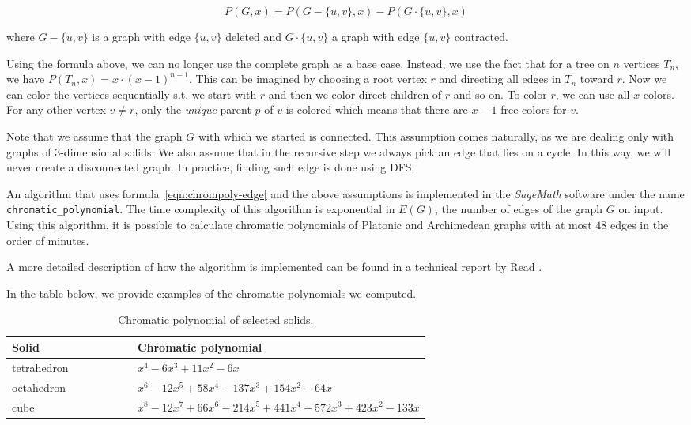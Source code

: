 \begin{equation}\label{eqn:chrompoly-edge}
    P(G,x) = P(G - \{u,v\},x) - P(G \cdot \{u,v\},x)
\end{equation}

where $G - \{u,v\}$ is a graph with edge $\{u,v\}$ deleted and $G \cdot \{u,v\}$ a graph with edge $\{u,v\}$ contracted. 

Using the formula above, we can no longer use the complete graph as a base case. Instead, we use the fact that for a tree on $n$ vertices $T_n$, we have $P(T_n,x) = x \cdot (x-1)^{n-1}$. This can be imagined by choosing a root vertex $r$ and directing all edges in $T_n$ toward $r$. Now we can color the vertices sequentially s.t. we start with $r$ and then we color direct children of $r$ and so on. To color $r$, we can use all $x$ colors. For any other vertex $v \neq r$, only the \textit{unique} parent $p$ of $v$ is colored which means that there are $x-1$ free colors for $v$. 

Note that we assume that the graph $G$ with which we started is connected. This assumption comes naturally, as we are dealing only with graphs of 3-dimensional solids. We also assume that in the recursive step we always pick an edge that lies on a cycle. In this way, we will never create a disconnected graph. In practice, finding such edge is done using DFS.

An algorithm that uses formula~\ref{eqn:chrompoly-edge} and the above assumptions is implemented in the \textit{SageMath} \cite{sagemath} software under the name \verb|chromatic_polynomial|. The time complexity of this algorithm is exponential in $E(G)$, the number of edges of the graph $G$ on input. Using this algorithm, it is possible to calculate chromatic polynomials of Platonic and Archimedean graphs with at most $48$ edges in the order of minutes.

A more detailed description of how the algorithm is implemented can be found in a technical report by Read \cite{read1987chromatic}.

In the table below, we provide examples of the chromatic polynomials we computed.

\begin{table}[H]
\centering
\begin{tabular}{lp{0.7\linewidth}}
\toprule
\textbf{Solid} & \textbf{Chromatic polynomial} \\
\midrule
tetrahedron & $x^{4} - 6x^{3} + 11x^{2} - 6x$ \\
octahedron & $x^{6} - 12x^{5} + 58x^{4} - 137x^{3} + 154x^{2} - 64x$ \\
cube & $x^{8} - 12x^{7} + 66x^{6} - 214x^{5} + 441x^{4} - 572x^{3} + 423x^{2} - 133x$ \\
\bottomrule
\end{tabular}
\caption{Chromatic polynomial of selected solids.}
\label{tab:selected-chrom-polys}
\end{table}


